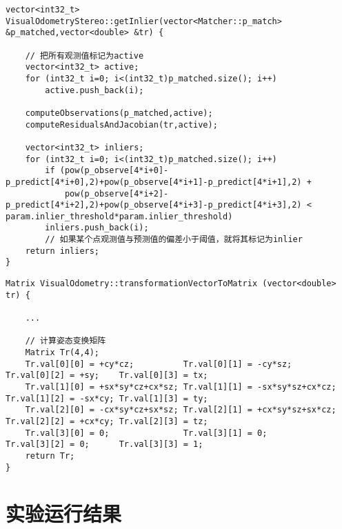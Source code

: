 \documentclass[UTF8]{ctexart}
\begin{document}
    \begin{verbatim}
vector<int32_t> VisualOdometryStereo::getInlier(vector<Matcher::p_match> &p_matched,vector<double> &tr) {

    // 把所有观测值标记为active
    vector<int32_t> active;
    for (int32_t i=0; i<(int32_t)p_matched.size(); i++)
        active.push_back(i);

    computeObservations(p_matched,active);
    computeResidualsAndJacobian(tr,active);

    vector<int32_t> inliers;
    for (int32_t i=0; i<(int32_t)p_matched.size(); i++)
        if (pow(p_observe[4*i+0]-p_predict[4*i+0],2)+pow(p_observe[4*i+1]-p_predict[4*i+1],2) +
            pow(p_observe[4*i+2]-p_predict[4*i+2],2)+pow(p_observe[4*i+3]-p_predict[4*i+3],2) < param.inlier_threshold*param.inlier_threshold)
        inliers.push_back(i);
        // 如果某个点观测值与预测值的偏差小于阈值，就将其标记为inlier
    return inliers;
}
    \end{verbatim}
    \begin{verbatim}
Matrix VisualOdometry::transformationVectorToMatrix (vector<double> tr) {

    ...

    // 计算姿态变换矩阵
    Matrix Tr(4,4);
    Tr.val[0][0] = +cy*cz;          Tr.val[0][1] = -cy*sz;          Tr.val[0][2] = +sy;    Tr.val[0][3] = tx;
    Tr.val[1][0] = +sx*sy*cz+cx*sz; Tr.val[1][1] = -sx*sy*sz+cx*cz; Tr.val[1][2] = -sx*cy; Tr.val[1][3] = ty;
    Tr.val[2][0] = -cx*sy*cz+sx*sz; Tr.val[2][1] = +cx*sy*sz+sx*cz; Tr.val[2][2] = +cx*cy; Tr.val[2][3] = tz;
    Tr.val[3][0] = 0;               Tr.val[3][1] = 0;               Tr.val[3][2] = 0;      Tr.val[3][3] = 1;
    return Tr;
}
    \end{verbatim}
    \section{实验运行结果}
\end{document}
